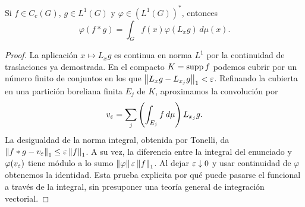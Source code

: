 \begin{lema}\label{v4:convolucion-funcional}
Si $f\in C_c(G)$, $g\in L^1(G)$ y $\varphi\in(L^1(G))^*$, entonces
\[
 \varphi(f*g)=\int_G f(x)\varphi(L_xg)\,d\mu(x).
\]
\end{lema}
\begin{proof}
La aplicación $x\mapsto L_xg$ es continua en norma $L^1$ por la continuidad de traslaciones ya demostrada. En el compacto $K=\operatorname{supp} f$ podemos cubrir por un número finito de conjuntos en los que $\left\lVert L_xg-L_{x_j}g\right\rVert_1<\varepsilon$. Refinando la cubierta en una partición boreliana finita $E_j$ de $K$, aproximamos la convolución por
\[
 v_\varepsilon=\sum_j\left(\int_{E_j}f\,d\mu\right)L_{x_j}g.
\]
La desigualdad de la norma integral, obtenida por Tonelli, da
$\left\lVert f*g-v_\varepsilon\right\rVert_1\le\varepsilon\left\lVert f\right\rVert_1$. A su vez, la diferencia entre la integral del enunciado y $\varphi(v_\varepsilon)$ tiene módulo a lo sumo $\left\lVert\varphi\right\rVert\varepsilon\left\lVert f\right\rVert_1$. Al dejar $\varepsilon\downarrow0$ y usar continuidad de $\varphi$ obtenemos la identidad. Esta prueba explicita por qué puede pasarse el funcional a través de la integral, sin presuponer una teoría general de integración vectorial.
\end{proof}


